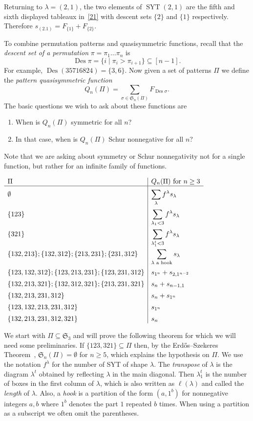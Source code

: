\documentclass[ALCO,ThmDefs,Unicode,epreuves]{cedram}
\newcommand{\emp}{\emptyset}
\newcommand{\sbe}{\subseteq}
\newcommand{\ptn}{\vdash}
\newcommand{\ree}[1]{\eqref{#1}}
\newcommand{\la}{\lambda}
\newcommand{\si}{\sigma}
\newcommand{\fS}{{\mathfrak S}}
\DeclareMathOperator{\Des}{Des}
\DeclareMathOperator{\SYT}{SYT}
\newcommand{\dil}{\displaystyle}
\begin{document}
Returning to $\la=(2,1)$, the two elements of $\SYT(2,1)$ are the fifth and sixth displayed tableaux in~\ree{21} with descent sets $\{2\}$ and $\{1\}$ respectively. Therefore $s_{(2.1)} = F_{\{1\}} + F_{\{2\}}$.

To combine permutation patterns and quasisymmetric functions, recall that the \emph{descent set of a permutation}
$\pi=\pi_1\dots\pi_n$ is
\[
\Des\pi=\{i \mid \pi_i>\pi_{i+1}\}\sbe[n-1].
\]
For example, $\Des(35716824)=\{3,6\}$.
Now given a set of patterns $\Pi$ we define the \emph{pattern quasisymmetric function}
\[
Q_n(\Pi)=\sum_{\si\in\fS_n(\Pi)} F_{\Des\si}.
\]
The basic questions we wish to ask about these functions are
\begin{enumerate}
\item When is $Q_n(\Pi)$ symmetric for all $n$?
\item In that case, when is $Q_n(\Pi)$ Schur nonnegative for all $n$?
\end{enumerate}
Note that we are asking about symmetry or Schur nonnegativity not for a single function, but rather for an infinite family of functions.

\begin{table}[htb]\centering
$
\begin{array}{l|l}
\Pi		& Q_n(\Pi) \text{ for $n\ge3$}\\
\hline
\emp 		&\dil \sum_\la f^\la s_\la \rule{0pt}{15pt}\\[15pt]
\{123\}	&\dil\sum_{\la_1<3} f^\la s_\la\\[15pt]
\{321\}	&\dil\sum_{\la_1^t<3} f^\la s_\la\\[15pt]
\{132,213\}; \{132,312\}; \{213,231\}; \{231,312\} &\dil\sum_{\text{$\la$ a hook}} s_\la\\[15pt]
\{123,132,312\}; \{123,213,231\}; \{123,231,312\} & s_{1^n} + s_{2,1^{n-2}}\\[5pt]
\{132,213,321\}; \{132,312,321\}; \{213,231,321\} & s_n + s_{n-1,1}\\[5pt]
\{132,213,231,312\}	& s_n + s_{1^n}\\[5pt]
\{123,132,213,231,312\} & s_{1^n} \\[5pt]
\{132,213,231,312,321\} & s_n 
\end{array}
$
\caption{The\vrule height5mm width0pt\ $\Pi$ for Theorem~\ref{main} along with the Schur expansions of $Q_n(\Pi)$ where $\la\ptn n$
\label{S3}}
\end{table}

We start with $\Pi\sbe\fS_3$ and will prove the following theorem for which we will need some preliminaries.
If $\{123,321\}\sbe \Pi$ then, by the Erd\H{o}s--Szekeres Theorem~\cite{es:cpg}, $\fS_n(\Pi)=\emp$ for $n\ge5$, which explains the hypothesis on $\Pi$. We use the notation $f^\la$ for the number of SYT of shape $\la$. The \emph{transpose} of $\la$ is the diagram $\la^t$ obtained by reflecting $\la$ in the main diagonal. Then $\la_1^t$ is the number of boxes in the first column of $\la$, which is also written as $\ell(\la)$ and called the \emph{length} of $\la$.
Also, a \emph{hook} is a partition of the form $(a,1^b)$ for nonnegative integers $a,b$ where $1^b$ denotes the part $1$ repeated $b$ times.
When using a partition as a subscript we often omit the parentheses. 
\end{document}
